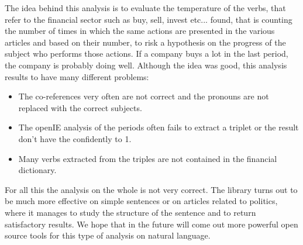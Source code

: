 The idea behind this analysis is to evaluate the temperature of the verbs, that refer to the financial sector such as buy, sell, invest etc... found, that is counting the number of times in which the same actions are presented in the various articles and based on their number, to risk a hypothesis on the progress of the subject who performs those actions. If a company buys a lot in the last period, the company is probably doing well.
Although the idea was good, this analysis results to have many different problems:
\begin{itemize}
\item
The co-references very often are not correct and the pronouns are not replaced with the correct subjects.
\item
The openIE analysis of the periods often fails to extract a triplet or the result don't have the confidently to 1.
\item
Many verbs extracted from the triples are not contained in the financial dictionary.
\end{itemize}
For all this the analysis on the whole is not very correct.
The library turns out to be much more effective on simple sentences or on articles related to politics, where it manages to study the structure of the sentence and to return satisfactory results. We hope that in the future will come out more powerful open source tools for this type of analysis on natural language.
